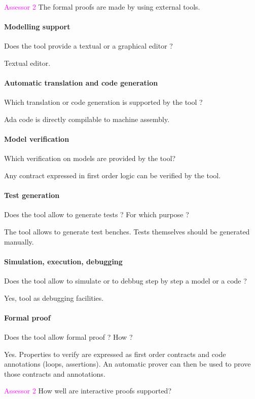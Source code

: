 \textcolor{magenta}{Assessor 2} The formal proofs are made by using external
tools.

\paragraph{Modelling support}
Does the tool provide a  textual or a graphical editor ?

Textual editor.

\paragraph{Automatic translation and code generation}
Which translation or code generation is supported by the tool ?

Ada code is directly compilable to machine assembly.

\paragraph{Model verification}
Which verification on models are provided by the tool?

Any contract expressed in first order logic can be verified by the
tool.

\paragraph{Test generation}
Does the tool allow to generate tests ? For  which purpose ?

The tool allows to generate test benches. Tests themselves should be
generated manually.

\paragraph{Simulation, execution, debugging}
Does the tool allow to simulate or to debbug step by step a model or a code ?

Yes, tool as debugging facilities.

\paragraph{Formal proof}
Does the tool allow formal proof ?  How ?

Yes. Properties to verify are expressed as first order contracts and
code annotations (loops, assertions). An automatic prover can then be
used to prove those contracts and annotations.

\textcolor{magenta}{Assessor 2} How well are interactive proofs supported?

